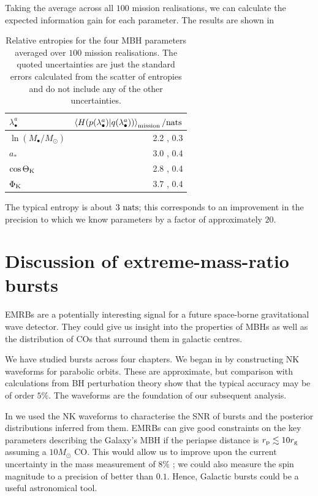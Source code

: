 Taking the average across all $100$ mission realisations, we can calculate the expected information gain for each parameter. The results are shown in 
\begin{table}\footnotesize
\centering
  \begin{tabular}{l D{,}{\,\pm\,}{3.3}}
  \toprule
  $\lambda_\bullet^a$ &  \\ \midrule
  $\ln(M_\bullet/M_\odot)$ & 2.2 , 0.3 \\
  $a_\ast$ & 3.0 , 0.4 \\
  $\cos\Theta_\mathrm{K}$ & 2.8 , 0.4  \\
  $\Phi_\mathrm{K}$ & 3.7 , 0.4 \\
  \bottomrule
\end{tabular}
  \caption{Relative entropies for the four MBH parameters averaged over $100$ mission realisations. The quoted uncertainties are just the standard errors calculated from the scatter of entropies and do not include any of the other uncertainties.}\label{tab:entropies}
\end{table}
The typical entropy is about $3 ~\mathrm{nats}$; this corresponds to an improvement in the precision to which we know parameters by a factor of approximately $20$.

\section{Discussion of extreme-mass-ratio bursts}\label{sec:EMRB-end}

EMRBs are a potentially interesting signal for a future space-borne gravitational wave detector. They could give us insight into the properties of MBHs as well as the distribution of COs that surround them in galactic centres.

We have studied bursts across four chapters. We began in  by constructing NK waveforms for parabolic orbits. These are approximate, but comparison with calculations from BH perturbation theory show that the typical accuracy may be of order $5\%$. The waveforms are the foundation of our subsequent analysis.

In  we used the NK waveforms to characterise the SNR of bursts and the posterior distributions inferred from them. EMRBs can give good constraints on the key parameters describing the Galaxy's MBH if the periapse distance is $r_\mathrm{p} \lesssim 10 r_\mathrm{g}$ assuming a $10 M_\odot$ CO. This would allow us to improve upon the current uncertainty in the mass measurement of $8\%$ \citep{Gillessen2009}; we could also measure the spin magnitude to a precision of better than $0.1$. Hence, Galactic bursts could be a useful astronomical tool.

